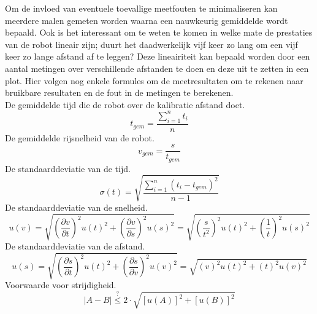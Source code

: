\documentclass{report}
\begin{document}
Om de invloed van eventuele toevallige meetfouten te minimaliseren kan meerdere malen gemeten worden waarna een nauwkeurig gemiddelde wordt bepaald. Ook is het interessant om te weten te komen in welke mate de prestaties van de robot lineair zijn; duurt het daadwerkelijk vijf keer zo lang om een vijf keer zo lange afstand af te leggen? Deze lineairiteit kan bepaald worden door een aantal metingen over verschillende afstanden te doen en deze uit te zetten in een plot.
Hier volgen nog enkele formules om de meetresultaten om te rekenen naar bruikbare resultaten en de fout in de metingen te berekenen.\\
\small{De gemiddelde tijd die de robot over de kalibratie afstand doet.}
\begin{equation}
\label{eq:avgTime}
t_{gem}=\frac{\sum_{i=1}^{n}t_i}{n}
\end{equation}
\small{De gemiddelde rijsnelheid van de robot.}
\begin{equation}
\label{eq:avgVel}
v_{gem} = \frac{s}{t_{gem}}
\end{equation}
\small{De standaarddeviatie van de tijd. \cite{epo1-onzekerheden}}
\begin{equation}
\label{eq:standaardDev}
\sigma(t) = \sqrt{\frac{\sum_{i=1}^{n}( t_i-t_{gem})^2}{n-1}}
\end{equation}
\small{De standaarddeviatie van de snelheid. \cite{epo1-onzekerheden}}
\begin{equation}
\label{eq:velError}
u(v) = \sqrt{\left (\frac{\partial v }{\partial t }\right)^2 u(t)^2 + \left (\frac{\partial v }{\partial s }\right)^2 u(s)^2} = \sqrt{\left (\frac{s }{{t}^2 }\right)^2 u(t)^2 + \left (\frac{1}{t}\right)^2 u(s)^2}
\end{equation}
\small{De standaarddeviatie van de afstand. \cite{epo1-onzekerheden}}
\begin{equation}
\label{eq:distError}
u(s) = \sqrt{\left (\frac{\partial s }{\partial t }\right)^2 u(t)^2 + \left (\frac{\partial s }{\partial v }\right)^2 u(v)^2} = \sqrt{(v)^2 u(t)^2 + (t)^2 u(v)^2} 
\end{equation}
\small{Voorwaarde voor strijdigheid. \cite{epo1-onzekerheden}}
\begin{equation}
\label{eq:strijdigheid}
|A-B|\overset{?}{\le}2\cdot\sqrt{[u(A)]^2+[u(B)]^2}
\end{equation}
\end{document}
